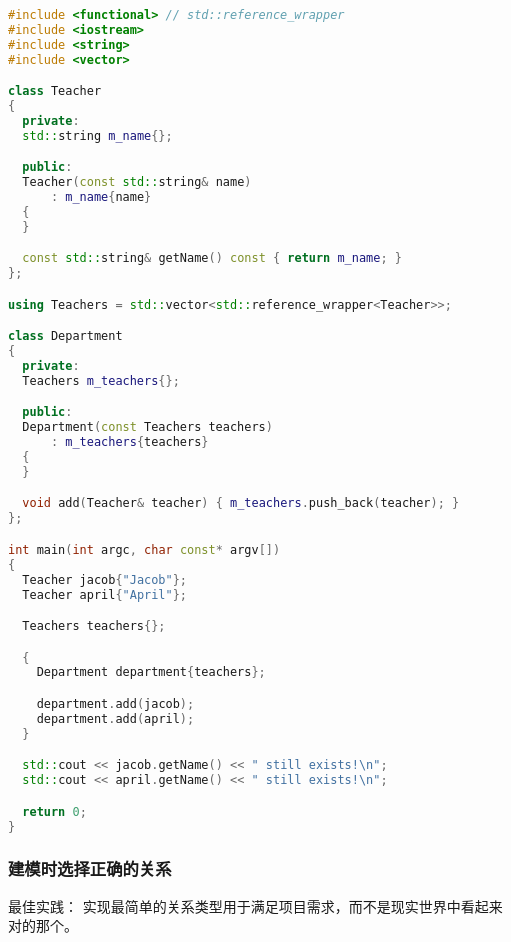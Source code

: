 \documentclass[../../LearnCpp.tex]{subfiles}
\begin{document}
\begin{lstlisting}[language=C++]
#include <functional> // std::reference_wrapper
#include <iostream>
#include <string>
#include <vector>

class Teacher
{
  private:
  std::string m_name{};

  public:
  Teacher(const std::string& name)
      : m_name{name}
  {
  }

  const std::string& getName() const { return m_name; }
};

using Teachers = std::vector<std::reference_wrapper<Teacher>>;

class Department
{
  private:
  Teachers m_teachers{};

  public:
  Department(const Teachers teachers)
      : m_teachers{teachers}
  {
  }

  void add(Teacher& teacher) { m_teachers.push_back(teacher); }
};

int main(int argc, char const* argv[])
{
  Teacher jacob{"Jacob"};
  Teacher april{"April"};

  Teachers teachers{};

  {
    Department department{teachers};

    department.add(jacob);
    department.add(april);
  }

  std::cout << jacob.getName() << " still exists!\n";
  std::cout << april.getName() << " still exists!\n";

  return 0;
}
\end{lstlisting}

\subsubsection*{建模时选择正确的关系}

最佳实践： 实现最简单的关系类型用于满足项目需求，而不是现实世界中看起来对的那个。
\end{document}
